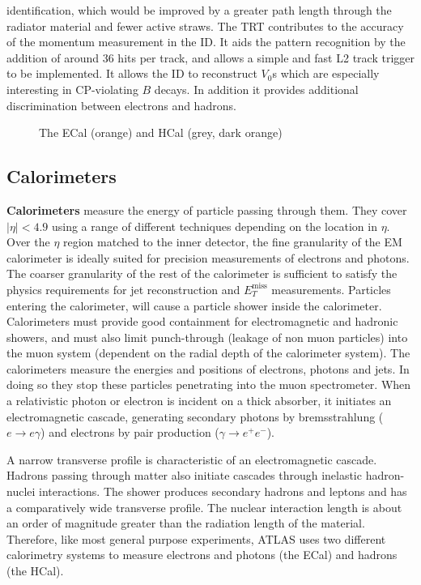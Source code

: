 \begin{enumerate}
    identification, which would be improved by a greater path length through the radiator material and fewer active straws. The TRT contributes to the accuracy of the momentum measurement in the ID. It aids the pattern recognition by the addition of around 36 hits per track, and allows a simple and fast L2 track trigger to be implemented. It allows the ID to reconstruct $V_0$s which are especially interesting in CP-violating $B$ decays. In addition it provides additional discrimination between electrons and hadrons.
\end{enumerate}
%
\begin{figure}[ht]
    \centering
    \caption{The ECal (orange) and HCal (grey, dark orange)}
    \label{fig:ATLAS-cals}
\end{figure}



\subsection{Calorimeters}

\textbf{Calorimeters} measure the energy of particle passing through them. They cover $|\eta| < 4.9$ using a range of different techniques depending on the location in $\eta$. Over the $\eta$ region matched to the inner detector, the fine granularity of the EM calorimeter is ideally suited for precision measurements of electrons and photons. The coarser granularity of the rest of the calorimeter is sufficient to satisfy the physics requirements for jet reconstruction and $E_T^{\textrm{miss}}$ measurements. Particles entering the calorimeter, will cause a particle shower inside the calorimeter. Calorimeters must provide good containment for electromagnetic and hadronic showers, and must also limit punch-through (leakage of non muon particles) into the muon system (dependent on the radial depth of the calorimeter system). The calorimeters measure the energies and positions of electrons, photons and jets. In doing so they stop these particles penetrating into the muon spectrometer. When a relativistic photon or electron is incident on a thick absorber, it initiates an electromagnetic cascade, generating secondary photons by bremsstrahlung ($e \rightarrow e\gamma$) and electrons by pair production ($\gamma \rightarrow e^+ e^- $).
    
A narrow transverse profile is characteristic of an electromagnetic cascade. Hadrons passing through matter also initiate cascades through inelastic hadron-nuclei interactions. The shower produces secondary hadrons and leptons and has a comparatively wide transverse profile. The nuclear interaction length is about an order of magnitude greater than the radiation length of the material. Therefore, like most general purpose experiments, ATLAS uses two different calorimetry systems to measure electrons and photons (the ECal) and hadrons (the HCal). 

